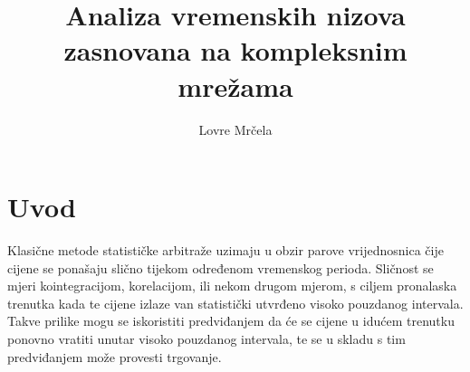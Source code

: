 \documentclass[lmodern, utf8, diplomski, numeric]{fer}
\begin{document}

\title{Analiza vremenskih nizova zasnovana na kompleksnim mrežama}

\author{Lovre Mrčela}

\maketitle



\tableofcontents

\chapter{Uvod}
  Klasične metode statističke arbitraže uzimaju u obzir parove vrijednosnica čije cijene se ponašaju slično tijekom određenom vremenskog perioda.
  Sličnost se mjeri kointegracijom, korelacijom, ili nekom drugom mjerom, s ciljem pronalaska trenutka kada te cijene izlaze van statistički utvrđeno visoko pouzdanog intervala.
  Takve prilike mogu se iskoristiti predviđanjem da će se cijene u idućem trenutku ponovno vratiti unutar visoko pouzdanog intervala, te se u skladu s tim predviđanjem može provesti trgovanje.
  
\end{document}
